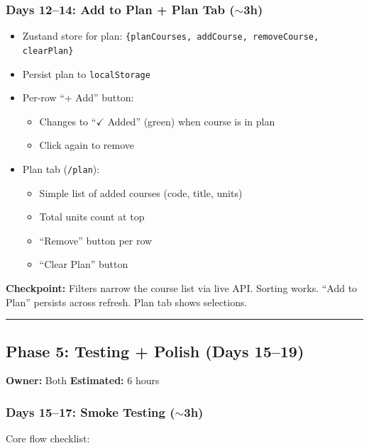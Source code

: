 \documentclass[11pt]{article}
\begin{document}
\subsubsection{Days 12--14: Add to Plan + Plan Tab ($\sim$3h)}

\begin{itemize}[leftmargin=2em]
    \item Zustand store for plan: \texttt{\{planCourses, addCourse, removeCourse, clearPlan\}}
    \item Persist plan to \texttt{localStorage}
    \item Per-row ``+ Add'' button:
    \begin{itemize}
        \item Changes to ``$\checkmark$ Added'' (green) when course is in plan
        \item Click again to remove
    \end{itemize}
    \item Plan tab (\texttt{/plan}):
    \begin{itemize}
        \item Simple list of added courses (code, title, units)
        \item Total units count at top
        \item ``Remove'' button per row
        \item ``Clear Plan'' button
    \end{itemize}
\end{itemize}

\noindent
\textbf{Checkpoint:} Filters narrow the course list via live API. Sorting works. ``Add to Plan'' persists across refresh. Plan tab shows selections.

\noindent\rule{\textwidth}{0.2pt}

\subsection{Phase 5: Testing + Polish (Days 15--19)}

\textbf{Owner:} Both \hfill \textbf{Estimated:} 6 hours

\subsubsection{Days 15--17: Smoke Testing ($\sim$3h)}

Core flow checklist:
\end{document}
